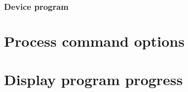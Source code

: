 
\subsubsection{Device program}
\label{app:sub:Device program}


\section{Process command options}
\label{app:sec:Process command options}


\section{Display program progress}
\label{app:sec:Display program progress}

